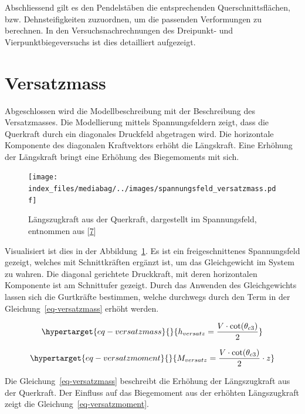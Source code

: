 \documentclass[
  12pt,
  letterpaper,
  egregdoesnotlikesansseriftitles]{scrreprt}
\begin{document}
Abschliessend gilt es den Pendelstäben die entsprechenden
Querschnittsflächen, bzw. Dehnsteifigkeiten zuzuordnen, um die passenden
Verformungen zu berechnen. In den Versuchsnachrechnungen des Dreipunkt-
und Vierpunktbiegeversuchs ist dies detailliert aufgezeigt.

\hypertarget{sec-versatzmass}{%
\section{Versatzmass}\label{sec-versatzmass}}

Abgeschlossen wird die Modellbeschreibung mit der Beschreibung des
Versatzmasses. Die Modellierung mittels Spannungsfeldern zeigt, dass die
Querkraft durch ein diagonales Druckfeld abgetragen wird. Die
horizontale Komponente des diagonalen Kraftvektors erhöht die
Längskraft. Eine Erhöhung der Längskraft bringt eine Erhöhung des
Biegemoments mit sich.

\begin{figure}[H]

{\centering \texttt{[image: index\_files/mediabag/../images/spannungsfeld\_versatzmass.pdf]}

}

\caption{\label{fig-laengszug_spf}Längszugkraft aus der Querkraft,
dargestellt im Spannungsfeld, entnommen aus
{[}\protect\hyperlink{ref-Thoma2020}{7}{]}}

\end{figure}

Visualisiert ist dies in der Abbildung~\ref{fig-laengszug_spf}. Es ist
ein freigeschnittenes Spannungsfeld gezeigt, welches mit Schnittkräften
ergänzt ist, um das Gleichgewicht im System zu wahren. Die diagonal
gerichtete Druckkraft, mit deren horizontalen Komponente ist am
Schnittufer gezeigt. Durch das Anwenden des Gleichgewichts lassen sich
die Gurtkräfte bestimmen, welche durchwegs durch den Term in der
Gleichung~\ref{eq-versatzmass} erhöht werden.

\begin{equation}\protect\hypertarget{eq-versatzmass}{}{
h_{versatz} = \frac{V \cdot \cot(\theta_{c3})}{2}
}\label{eq-versatzmass}\end{equation}

\begin{equation}\protect\hypertarget{eq-versatzmoment}{}{
M_{versatz} = \frac{V \cdot \cot(\theta_{c3})}{2} \cdot z
}\label{eq-versatzmoment}\end{equation}

Die Gleichung~\ref{eq-versatzmass} beschreibt die Erhöhung der
Längszugkraft aus der Querkraft. Der Einfluss auf das Biegemoment aus
der erhöhten Längszugkraft zeigt die Gleichung~\ref{eq-versatzmoment}.
\end{document}
